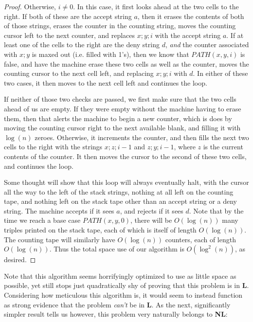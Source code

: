 \begin{proof}
\par Otherwise, $i \neq 0$. In this case, it first looks ahead at the two cells to the right. If both of these are the accept string $a$, then it erases the contents of both of those strings, erases the counter in the counting string, moves the counting cursor left to the next counter, and replaces $x;y;i$ with the accept string $a$. If at least one of the cells to the right are the deny string $d$, \textit{and} the counter associated with $x;y$ is maxed out (i.e. filled with 1's), then we know that $PATH(x,y,i)$ is false, and have the machine erase these two cells as well as the counter, moves the counting cursor to the next cell left, and replacing $x;y;i$ with $d$. In either of these two cases, it then moves to the next cell left and continues the loop.
\par If neither of those two checks are passed, we first make sure that the two cells ahead of us are empty. If they were empty without the machine having to erase them, then that alerts the machine to begin a new counter, which is does by moving the counting cursor right to the next available blank, and filling it with $\log(n)$ zeroes. Otherwise, it increments the counter, and then fills the next two cells to the right with the strings $x;z;i-1$ and $z;y;i-1$, where $z$ is the current contents of the counter. It then moves the cursor to the second of these two cells, and continues the loop.
\par Some thought will show that this loop will always eventually halt, with the cursor all the way to the left of the stack strings, nothing at all left on the counting tape, and nothing left on the stack tape other than an accept string or a deny string. The machine accepts if it sees $a$, and rejects if it sees $d$.
Note that by the time we reach a base case $PATH(x,y,0)$, there will be $O(\log(n))$ many triples printed on the stack tape, each of which is itself of length $O(\log(n))$. The counting tape will similarly have $O(\log(n))$ counters, each of length $O(\log(n))$. Thus the total space use of our algorithm is $O(\log^2(n))$, as desired. 
\end{proof}
Note that this algorithm seems horrifyingly optimized to use as little space as possible, yet still stops just quadratically shy of proving that this problem is in \textbf{L}. Considering how meticulous this algorithm is, it would seem to instead function as strong evidence that the problem \textit{can't} be in \textbf{L}. As the next, significantly simpler result tells us however, this problem very naturally belongs to \textbf{NL}:
